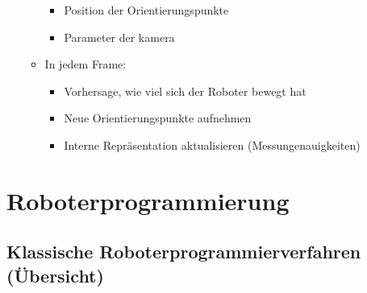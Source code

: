 \documentclass[paper=a4, fontsize=11pt]{scrartcl} %
\numberwithin{equation}{section} %
\numberwithin{figure}{section} %
\numberwithin{table}{section} %
\begin{document}
\begin{itemize}
\begin{itemize}
\begin{itemize}
\item Position der Orientierungspunkte
\item Parameter der kamera
\end{itemize}
\item In jedem Frame:
\begin{itemize}
\item Vorhersage, wie viel sich der Roboter bewegt hat
\item Neue Orientierungspunkte aufnehmen
\item Interne Repräsentation aktualisieren (Messungenauigkeiten)
\end{itemize}
\end{itemize}
\end{itemize}

\section{Roboterprogrammierung}

\subsection{Klassische Roboterprogrammierverfahren (Übersicht)}
\end{document}
